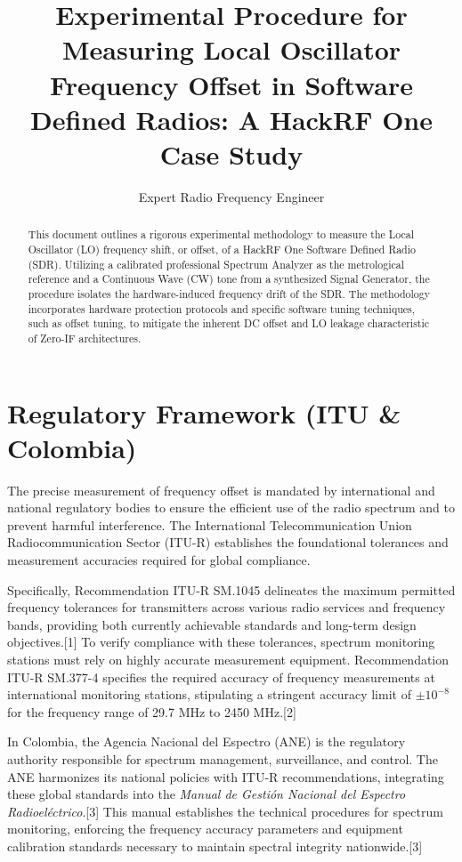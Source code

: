 \documentclass[journal, a4paper]{IEEEtran}
\begin{document}
\title{Experimental Procedure for Measuring Local Oscillator Frequency Offset in Software Defined Radios: A HackRF One Case Study}

\author{Expert Radio Frequency Engineer}

\maketitle

\begin{abstract}
This document outlines a rigorous experimental methodology to measure the Local Oscillator (LO) frequency shift, or offset, of a HackRF One Software Defined Radio (SDR). Utilizing a calibrated professional Spectrum Analyzer as the metrological reference and a Continuous Wave (CW) tone from a synthesized Signal Generator, the procedure isolates the hardware-induced frequency drift of the SDR. The methodology incorporates hardware protection protocols and specific software tuning techniques, such as offset tuning, to mitigate the inherent DC offset and LO leakage characteristic of Zero-IF architectures.
\end{abstract}

\section{Regulatory Framework (ITU \& Colombia)}

The precise measurement of frequency offset is mandated by international and national regulatory bodies to ensure the efficient use of the radio spectrum and to prevent harmful interference. The International Telecommunication Union Radiocommunication Sector (ITU-R) establishes the foundational tolerances and measurement accuracies required for global compliance.

Specifically, Recommendation ITU-R SM.1045 delineates the maximum permitted frequency tolerances for transmitters across various radio services and frequency bands, providing both currently achievable standards and long-term design objectives.[1] To verify compliance with these tolerances, spectrum monitoring stations must rely on highly accurate measurement equipment. Recommendation ITU-R SM.377-4 specifies the required accuracy of frequency measurements at international monitoring stations, stipulating a stringent accuracy limit of $\pm 10^{-8}$ for the frequency range of 29.7 MHz to 2450 MHz.[2]

In Colombia, the Agencia Nacional del Espectro (ANE) is the regulatory authority responsible for spectrum management, surveillance, and control. The ANE harmonizes its national policies with ITU-R recommendations, integrating these global standards into the \textit{Manual de Gestión Nacional del Espectro Radioeléctrico}.[3] This manual establishes the technical procedures for spectrum monitoring, enforcing the frequency accuracy parameters and equipment calibration standards necessary to maintain spectral integrity nationwide.[3]
\end{document}
